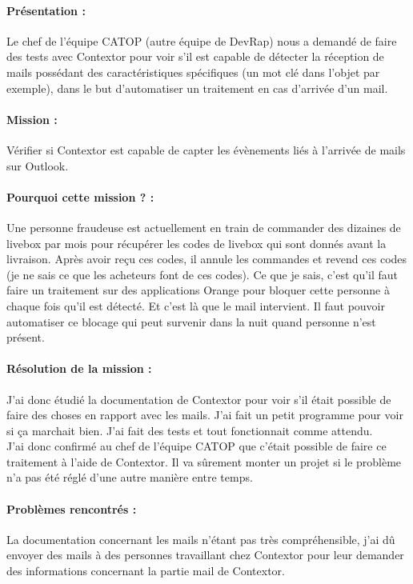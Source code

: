 \documentclass[a4paper,twoside,12pt,openright]{report}
\begin{document}
\paragraph {Présentation :} 
Le chef de l'équipe CATOP (autre équipe de DevRap) nous a demandé de faire des tests avec Contextor pour voir s'il est capable de détecter la réception de mails possédant des caractéristiques spécifiques (un mot clé dans l'objet par exemple), dans le but d'automatiser un traitement en cas d'arrivée d'un mail.
\paragraph {Mission :}
Vérifier si Contextor est capable de capter les évènements liés à l'arrivée de mails sur Outlook.
\paragraph {Pourquoi cette mission ? :}
Une personne fraudeuse est actuellement en train de commander des dizaines de livebox par mois pour récupérer les codes de livebox qui sont donnés avant la livraison. Après avoir reçu ces codes, il annule les commandes et revend ces codes (je ne sais ce que les acheteurs font de ces codes). Ce que je sais, c'est qu'il faut faire un traitement sur des applications Orange pour bloquer cette personne à chaque fois qu'il est détecté. Et c'est là que le mail intervient. Il faut pouvoir automatiser ce blocage qui peut survenir dans la nuit quand personne n'est présent. 
\paragraph {Résolution de la mission :}
J'ai donc étudié la documentation de Contextor pour voir s'il était possible de faire des choses en rapport avec les mails. J'ai fait un petit programme pour voir si ça marchait bien. J'ai fait des tests et tout fonctionnait comme attendu.\\
J'ai donc confirmé au chef de l'équipe CATOP que c'était possible de faire ce traitement à l'aide de Contextor. Il va sûrement monter un projet si le problème n'a pas été réglé d'une autre manière entre temps.
\paragraph {Problèmes rencontrés :}
La documentation concernant les mails n'étant pas très compréhensible, j'ai dû envoyer des mails à des personnes travaillant chez Contextor pour leur demander des informations concernant la partie mail de Contextor.
\newpage
\end{document}

